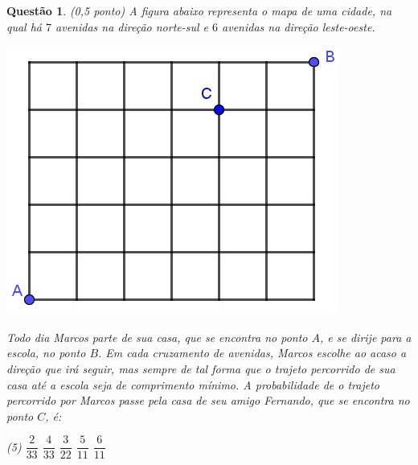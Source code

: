 \documentclass[oneside,a4paper,12pt]{article}
\newcommand{\negrito}[1]{\mbox{\boldmath{$#1$}}}
\theoremstyle{Colorido}
\theoremstyle{solu}
\theoremstyle{dotlessP}
\newtheorem{sol}{Questão}
\begin{document}
\newpage
	\begin{sol}
\textit{(0,5 ponto)} \newline \newline A figura abaixo representa o mapa de uma cidade, na qual há $7$ avenidas na direção norte-sul e $6$ avenidas na direção leste-oeste.
\begin{center}
\includegraphics[scale=0.7]{Provas e Avaliações/arq-01ciclo2.jpg}    
\end{center}

Todo dia Marcos parte de sua casa, que se encontra no ponto $A$, e se dirije para a escola, no ponto $B$. Em cada cruzamento de avenidas, Marcos escolhe ao acaso a direção que irá seguir, mas sempre de tal forma que o trajeto percorrido de sua casa até a escola seja de comprimento mínimo. A probabilidade de o trajeto percorrido por Marcos passe pela casa de seu amigo Fernando, que se encontra no ponto $C$, é:
\begin{tasks}[counter-format={(tsk[a])},label-width=3.6ex, label-format = {\bfseries}, column-sep = {20pt}](5)
\task[\textcolor{blue}{$\negrito{(a)} $}] $\dfrac{2}{33}$
\task[\textcolor{blue}{$\negrito{(b)} $}] $\dfrac{4}{33}$
\task[\textcolor{blue}{$\negrito{(c)} $}] $\dfrac{3}{22}$
\task[\textcolor{blue}{$\negrito{(d)} $}] $\dfrac{5}{11}$
\task[\textcolor{blue}{$\negrito{(e)} $}] $\dfrac{6}{11}$
\end{tasks}
\end{sol}
\end{document}
